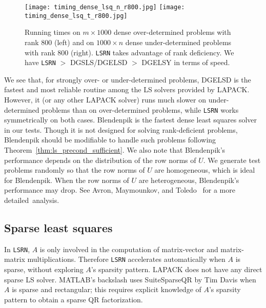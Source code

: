 \documentclass{siamltex}
\begin{document}
\begin{figure}
  \centering
  \texttt{[image: timing\_dense\_lsq\_n\_r800.jpg]}
  \texttt{[image: timing\_dense\_lsq\_t\_r800.jpg]}
  \caption{Running times on $m \times 1000$ dense over-determined problems with
    rank $800$ (left) and on $1000 \times n$ dense under-determined problems
    with rank $800$ (right). \texttt{LSRN} takes advantage of rank
    deficiency. We have \texttt{LSRN} $>$ DGSLS/DGELSD $>$ DGELSY in terms of
    speed.}
  \label{fig:timing_dense_rank_800}
\end{figure}

We see that, for strongly over- or under-determined problems, DGELSD is the
fastest and most reliable routine among the LS solvers provided by
LAPACK. However, it (or any other LAPACK solver) runs much slower on
under-determined problems than on over-determined problems, while \texttt{LSRN}
works symmetrically on both cases.  Blendenpik is the fastest dense least
squares solver in our tests. Though it is not designed for solving
rank-deficient problems, Blendenpik should be modifiable to handle such problems
following Theorem~\ref{thm:ls_precond_sufficient}.  We also note that
Blendenpik's performance depends on the distribution of the row norms of $U$. We
generate test problems randomly so that the row norms of $U$ are homogeneous,
which is ideal for Blendenpik. When the row norms of $U$ are heterogeneous,
Blendenpik's performance may drop.  See Avron, Maymounkov, and
Toledo~\cite{avron2010blendenpik} for a more detailed~analysis.

\subsection{Sparse least squares}
\label{sec:sparse-lsq}

In \texttt{LSRN}, $A$ is only involved in the computation of matrix-vector and
matrix-matrix multiplications. Therefore \texttt{LSRN} accelerates automatically
when $A$ is sparse, without exploring $A$'s sparsity pattern. LAPACK does not
have any direct sparse LS solver. MATLAB's backslash uses SuiteSparseQR by Tim
Davis \cite{davis2008algorithm} when $A$ is sparse and rectangular; this
requires explicit knowledge of $A$'s sparsity pattern to obtain a sparse QR
factorization.
\end{document}
